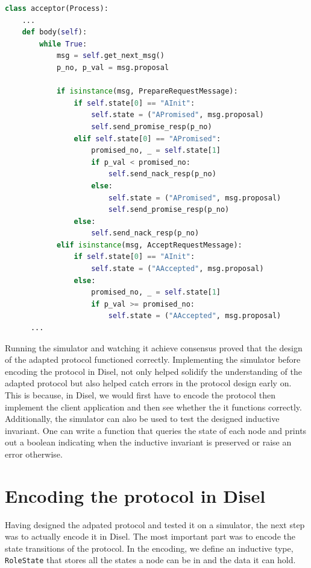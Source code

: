 \begin{lstlisting}[language=Python]
class acceptor(Process):
    ...
    def body(self):
        while True:
            msg = self.get_next_msg()
            p_no, p_val = msg.proposal

            if isinstance(msg, PrepareRequestMessage):
                if self.state[0] == "AInit":
                    self.state = ("APromised", msg.proposal)
                    self.send_promise_resp(p_no)
                elif self.state[0] == "APromised":
                    promised_no, _ = self.state[1]
                    if p_val < promised_no:
                        self.send_nack_resp(p_no)
                    else:
                        self.state = ("APromised", msg.proposal)
                        self.send_promise_resp(p_no)
                else:
                    self.send_nack_resp(p_no)
            elif isinstance(msg, AcceptRequestMessage):
                if self.state[0] == "AInit":
                    self.state = ("AAccepted", msg.proposal)
                else:
                    promised_no, _ = self.state[1]
                    if p_val >= promised_no:
                        self.state = ("AAccepted", msg.proposal)
      ...
\end{lstlisting}

Running the simulator and watching it achieve consensus proved that the design
of the adapted protocol functioned correctly. Implementing the simulator before
encoding the protocol in Disel, not only helped solidify the understanding
of the adapted protocol but also helped catch errors in the protocol design
early on. This is because, in Disel, we would first have to encode the
protocol then implement the client application and then see whether the it
functions correctly. Additionally, the simulator can also be used to test the
designed inductive invariant. One can write a function that queries the state of
each node and prints out a boolean indicating when the inductive invariant is
preserved or raise an error otherwise.

\section{Encoding the protocol in Disel}
Having designed the adpated protocol and tested it on a simulator, the next
step was to actually encode it in Disel. The most important part was to encode
the state transitions of the protocol. In the encoding, we define an inductive
type, \texttt{RoleState} that stores all the states a node can be in and the
data it can hold.

